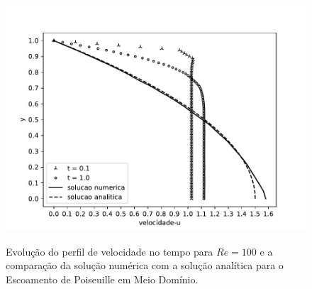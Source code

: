 \begin{figure}[H]
     \centering
     \includegraphics[scale=1]{./02_chaps/cap_validation/figure/half_poiseuille_velocity.pdf}\\
     \medskip
     \caption{Evolução do perfil de velocidade no tempo para $Re=100$ e
     a comparação da solução numérica com a solução analítica para o Escoamento de Poiseuille em Meio Domínio.}
     \label{velocidade half poiseuille}
\end{figure}

\newpage
